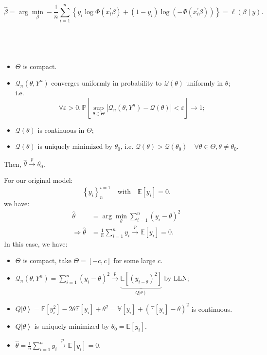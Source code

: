 \begin{eg}
    \[
    \hat{\beta} = \arg \min_{\beta} -\frac{1}{n} \sum_{i=1}^{n} \left\{y_i \log \Phi\left(x_i^{\prime} \beta\right) + (1-y_i) \log \left(-\Phi\left(x_i^{\prime} \beta\right)\right)\right\} = \ell(\beta \mid y).
    \]
\end{eg}

\begin{proposition} \label{prop:consistency}
    \ 
    
    \begin{assumption}
        \

        \begin{itemize}
            \item $\Theta$ is compact.
            \item $\mathcal{Q}_n(\theta, Y^n)$ converges uniformly in probability to $\mathcal{Q}(\theta)$ uniformly in $\theta$;\\
            i.e. \[
            \forall \varepsilon > 0, \mathbb{P}\left[\sup_{\theta \in \Theta} \left| \mathcal{Q}_n(\theta, Y^n) - \mathcal{Q}(\theta) \right| < \varepsilon\right] \to 1;
            \]
            \item $\mathcal{Q}(\theta)$ is continuous in $\Theta$;
            \item $\mathcal{Q}(\theta)$ is uniquely minimized by $\theta_0$, i.e. $\mathcal{Q}(\theta) > \mathcal{Q}(\theta_0) \quad \forall \theta \in \Theta, \theta \neq \theta_0.$
        \end{itemize}
    \end{assumption}   
    Then, $\hat{\theta} \overset{p}{\rightarrow} \theta_0$.
\end{proposition}

For our original model:
\[
\left\{ y_i \right\}^{i=1}_{n} \quad \text{with} \quad \mathbb{E}[y_i]=0.
\]
we have:
\begin{align*}
    \hat{\theta} &= \arg \min_{\theta} \sum_{i=1}^{n} \left(y_{i}-\theta \right)^2 \\
    \Rightarrow \hat{\theta} &= \frac{1}{n} \sum_{i=1}^{n} y_i \overset{p}{\rightarrow} \mathbb{E}[y_i] = 0.
\end{align*}
In this case, we have:
\begin{itemize}
    \item $\Theta$ is compact, take $\Theta = [-c, c]$ for some large $c$.
    \item $\mathcal{Q}_n(\theta, Y^n) = \sum_{i=1}^{n} \left(y_i - \theta\right)^2 \overset{p}{\rightarrow} \underset{Q \left | \theta  \right \rangle}{\underbrace{\mathbb{E}\left[(y_{i-\theta})^2\right]}}$ by LLN;
    \item $Q \left | \theta  \right \rangle = \mathbb{E}[y_i^2] - 2 \theta \mathbb{E}[y_i] + \theta^2 = \mathbb{V}[y_i] + \left( \mathbb{E}[y_i]-\theta \right)^2$ is continuous.
    \item $Q \left | \theta  \right \rangle$ is uniquely minimized by $\theta_0 = \mathbb{E}[y_i]$.
    \item $\hat{\theta} = \frac{1}{n} \sum_{i=1}^{n} y_i \overset{p}{\rightarrow} \mathbb{E}[y_i] = 0$.
\end{itemize}

